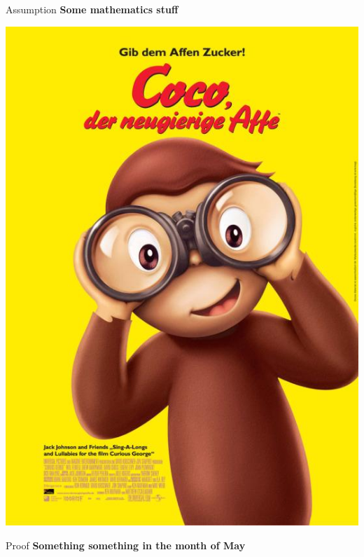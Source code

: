 \documentclass[
  a0paper,
  portrait,
  fontscale=.35 %
  ]{baposter}
\begin{document}
\begin{poster}
\begin{posterbox}[name=assumption,column=0,row=1, below=intro]{Assumption}
	\textbf{Some mathematics stuff}
	\vspace{4cm}
	\begin{center}
		\includegraphics[width=\textwidth]{imgs/coco_affe.jpg}
	\end{center}
	\vspace{5cm}
\end{posterbox}


\begin{posterbox}[name=proof,column=1,row=1, below=intro]{Proof}
	\textbf{Something something in the month of May}
	\vspace{5cm}
\end{posterbox}


\end{poster}
\end{document}
